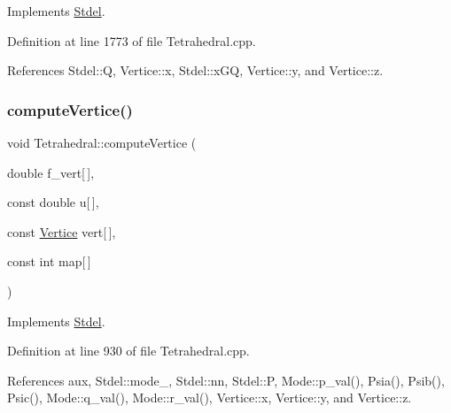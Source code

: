 Implements \hyperlink{classStdel_a59195ad1ce9b90ef83fd935698dc3305}{Stdel}.



Definition at line 1773 of file Tetrahedral.\+cpp.



References Stdel\+::Q, Vertice\+::x, Stdel\+::x\+GQ, Vertice\+::y, and Vertice\+::z.

\mbox{\label{classTetrahedral_a0cb9858197838f9f018e41a0ccd881c5}} 
\subsubsection{\texorpdfstring{compute\+Vertice()}{computeVertice()}}
{\footnotesize\ttfamily void Tetrahedral\+::compute\+Vertice (\begin{DoxyParamCaption}\item[{double}]{f\+\_\+vert\mbox{[}$\,$\mbox{]},  }\item[{const double}]{u\mbox{[}$\,$\mbox{]},  }\item[{const \hyperlink{structVertice}{Vertice}}]{vert\mbox{[}$\,$\mbox{]},  }\item[{const int}]{map\mbox{[}$\,$\mbox{]} }\end{DoxyParamCaption})\hspace{0.3cm}{\ttfamily [virtual]}}



Implements \hyperlink{classStdel_a74eed41f670878759c84e2014b4a2cd5}{Stdel}.



Definition at line 930 of file Tetrahedral.\+cpp.



References aux, Stdel\+::mode\+\_\+, Stdel\+::nn, Stdel\+::P, Mode\+::p\+\_\+val(), Psia(), Psib(), Psic(), Mode\+::q\+\_\+val(), Mode\+::r\+\_\+val(), Vertice\+::x, Vertice\+::y, and Vertice\+::z.

